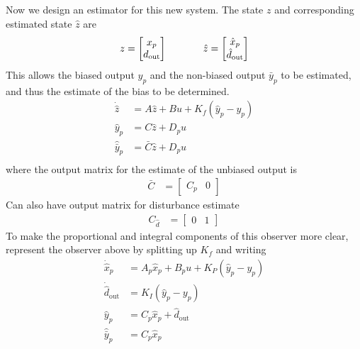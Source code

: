 Now we design an estimator for this new system.
The state $z$ and corresponding estimated state $\hat{z}$ are
\begin{equation*}
  z=
  \begin{bmatrix}
    x_{p} \\
    d_{\text{out}}
  \end{bmatrix}
  \hspace{0.5in}
  \hat{z}=
  \begin{bmatrix}
    \hat{x}_{p} \\
    \hat{d}_{\text{out}}
  \end{bmatrix}
\end{equation*}
This allows the biased output $y_{p}$ and the non-biased output $\bar{y}_{p}$ to be estimated, and thus the estimate of the bias to be determined.
\begin{equation*}
  \begin{alignedat}{1}
    \dot{\hat{z}}&=A\hat{z}+Bu+K_{f}(\hat{y}_{p}-y_{p}) \\
    \hat{y}_{p}&=C\hat{z}+D_{p}u \\
    \hat{\bar{y}}_{p}&=\bar{C}\hat{z}+D_{p}u \\
  \end{alignedat}
\end{equation*}
where the output matrix for the estimate of the unbiased output is
\begin{align*}
  \bar{C}&=
  \begin{bmatrix}
    C_{p} & 0
  \end{bmatrix}
\end{align*}
Can also have output matrix for disturbance estimate
\begin{align*}
  C_{\hat{d}}&=
  \begin{bmatrix}
    0 & 1
  \end{bmatrix}
\end{align*}
To make the proportional and integral components of this observer more clear, represent the observer above by splitting up $K_{f}$ and writing
\begin{equation*}
  \begin{alignedat}{1}
    \dot{\hat{x}}_{p}&=A_{p}\hat{x}_{p}+B_{p}u+K_{P}(\hat{y}_{p}-y_{p}) \\
    \dot{\hat{d}}_{\text{out}}&=K_{I}(\hat{y}_{p}-y_{p}) \\
    \hat{y}_{p}&=C_{p}\hat{x}_{p}+\hat{d}_{\text{out}} \\
    \hat{\bar{y}}_{p}&=C_{p}\hat{x}_{p}
  \end{alignedat}
\end{equation*}
